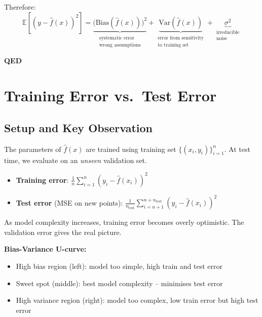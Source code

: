 \documentclass[12pt,a4paper]{article}
\newcommand{\E}{\mathbb{E}}
\newcommand{\Var}{\mathrm{Var}}
\newcommand{\Bias}{\mathrm{Bias}}
\begin{document}
Therefore:
\[
\boxed{
\E\!\left[(y - \hat{f}(x))^2\right]
= \underbrace{\bigl(\Bias(\hat{f}(x))\bigr)^2}_{\substack{\text{systematic error}\\\text{wrong assumptions}}}
+ \underbrace{\Var(\hat{f}(x))}_{\substack{\text{error from sensitivity}\\\text{to training set}}}
+ \underbrace{\sigma^2}_{\substack{\text{irreducible}\\\text{noise}}}
}
\]

\hfill\textbf{QED}

\section{Training Error vs.\ Test Error}

\subsection{Setup and Key Observation}

The parameters of $\hat{f}(x)$ are trained using training set $\{(x_i, y_i)\}_{i=1}^{n}$. At test time, we evaluate on an \emph{unseen} validation set.

\begin{defbox}
\begin{itemize}
  \item \textbf{Training error}: $\displaystyle\frac{1}{n}\sum_{i=1}^{n}(y_i - \hat{f}(x_i))^2$
  \item \textbf{Test error} (MSE on new points): $\displaystyle\frac{1}{n_{\text{test}}}\sum_{i=n+1}^{n+n_{\text{test}}}(y_i - \hat{f}(x_i))^2$
\end{itemize}
\end{defbox}

As model complexity increases, training error becomes overly optimistic. The validation error gives the real picture.

\textbf{Bias-Variance U-curve:}
\begin{itemize}
  \item High bias region (left): model too simple, high train and test error
  \item Sweet spot (middle): best model complexity -- minimises test error
  \item High variance region (right): model too complex, low train error but high test error
\end{itemize}
\end{document}
